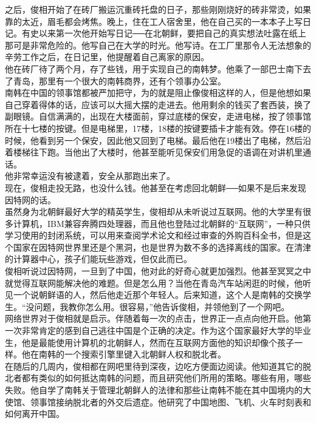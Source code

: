 之后，俊相开始了在砖厂搬运沉重砖托盘的日子，那些刚刚烧好的砖非常烫，如果靠的太近，眉毛都会烤焦。晚上，住在工人宿舍里，他在自己买的一本本子上写日记。有史以来第一次他开始写日记──在北朝鲜，要把自己的真实想法吐露在纸上那可是非常危险的。他写自己在大学的时光。他写诗。在工厂里那令人无法想象的辛劳工作之后，在日记里，他提醒着自己离家的原因。\\

他在砖厂待了两个月，存了些钱，用于实现自己的南韩梦。他乘了一部巴士南下去了青岛，那里有一个很大的南韩商界，还有个领事办公室。\\

南韩在中国的领事馆都被严加把守，为的就是阻止像俊相这样的人，但是他想如果自己穿着得体的话，应该可以大摇大摆的走进去。他用剩余的钱买了套西装，换了副眼镜。自信满满的，出现在大楼面前，穿过底楼的保安，走进电梯，按了领事馆所在十七楼的按键。但是电梯里，17楼，18楼的按键要插卡才能有效。停在16楼的时候，他看到另一个保安，因此他又回到了电梯。最后他在19楼出了电梯，然后沿着楼梯往下跑。当他出了大楼时，他甚至能听见保安们用急促的语调在对讲机里通话。\\

他非常幸运没有被逮着，安全从那跑出来了。\\

现在，俊相走投无路，也没什么钱。他甚至在考虑回北朝鲜──如果不是后来发现因特网的话。\\

虽然身为北朝鲜最好大学的精英学生，俊相却从未听说过互联网。他的大学里有很多计算机，IBM兼容奔腾四处理器，而且他也登陆过北朝鲜的“互联网”，一种只供学习使用的封闭系统，可以用来查阅学术论文和经过审查的外购百科全书，但是这个国家在因特网世界里还是个黑洞，也是世界为数不多的选择离线的国家。在清津的计算器中心，孩子们能玩些游戏，但仅此而已。\\

俊相听说过因特网，一旦到了中国，他对此的好奇心就更加强烈。他甚至冥冥之中就觉得互联网能解决他的难题。但是怎么用？当他在青岛汽车站闲逛的时候，他听见一个说朝鲜语的人，然后他走近那个年轻人。后来知道，这个人是南韩的交换学生。“没问题，我教你怎么用。很容易，”他告诉俊相，并领他到了一个网吧。\\

网络世界对于俊相就是启示。伴随着每一次的点击，世界正一点点向他开启。他第一次非常肯定的感到自己逃往中国是个正确的决定。作为这个国家最好大学的毕业生，他是最能使用计算机的北朝鲜人，然而在互联网方面他的知识却像个孩子一样。他在南韩的一个搜索引擎里键入北朝鲜人权和脱北者。\\

在随后的几周内，俊相都在网吧里待到深夜，边吃方便面边阅读。他知道其它的脱北者都有类似的如何抵达南韩的问题，而且研究他们所用的策略。哪些有用，哪些失败。他自学了南韩关于管理北朝鲜人的法律和那些让南韩不能在其中国境内的大使馆、领事馆接纳脱北者的外交后遗症。他研究了中国地图、飞机、火车时刻表和如何离开中国。\\

